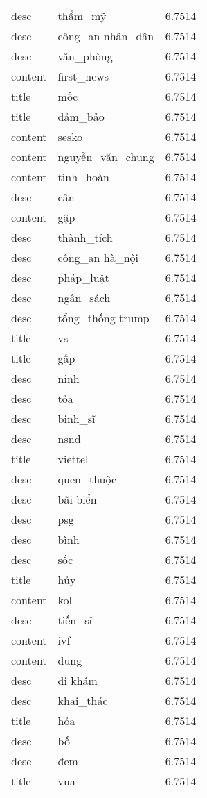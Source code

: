 \documentclass{article}
\begin{document}
\begin{tabular}{lll}
desc & thẩm\_mỹ & 6.7514\\
desc & công\_an nhân\_dân & 6.7514\\
desc & văn\_phòng & 6.7514\\
content & first\_news & 6.7514\\
title & mốc & 6.7514\\
title & đảm\_bảo & 6.7514\\
content & sesko & 6.7514\\
content & nguyễn\_văn\_chung & 6.7514\\
content & tinh\_hoàn & 6.7514\\
desc & cân & 6.7514\\
content & gập & 6.7514\\
desc & thành\_tích & 6.7514\\
desc & công\_an hà\_nội & 6.7514\\
desc & pháp\_luật & 6.7514\\
desc & ngân\_sách & 6.7514\\
desc & tổng\_thống trump & 6.7514\\
title & vs & 6.7514\\
title & gấp & 6.7514\\
desc & ninh & 6.7514\\
desc & tỏa & 6.7514\\
desc & binh\_sĩ & 6.7514\\
desc & nsnd & 6.7514\\
title & viettel & 6.7514\\
desc & quen\_thuộc & 6.7514\\
desc & bãi biển & 6.7514\\
desc & psg & 6.7514\\
desc & bình & 6.7514\\
desc & sốc & 6.7514\\
title & hủy & 6.7514\\
content & kol & 6.7514\\
desc & tiến\_sĩ & 6.7514\\
content & ivf & 6.7514\\
content & dung & 6.7514\\
desc & đi khám & 6.7514\\
desc & khai\_thác & 6.7514\\
title & hỏa & 6.7514\\
desc & bố & 6.7514\\
desc & đem & 6.7514\\
title & vua & 6.7514\\

\end{tabular}
\end{document}
